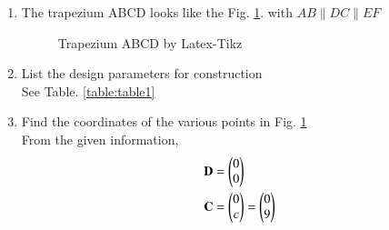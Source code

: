 %
\renewcommand{\theequation}{\theenumi}
\begin{enumerate}[label=\thesection.\arabic*.,ref=\thesection.\theenumi]

\item The trapezium ABCD looks like the Fig. \ref{fig:trapezium_ABCD}.
with $AB \parallel DC \parallel EF $


\begin{figure}[!ht]
\centering
\resizebox{\columnwidth}{!}{}
\caption{Trapezium ABCD by Latex-Tikz}
\label{fig:trapezium_ABCD}	
\end{figure}
%


%
%
\item List the design parameters for construction
\label{const:table1}
\\
\solution See Table. \ref{table:table1} 
%
\begin{table}[ht!]
\centering

\caption{To construct trapezium ABCD}
\label{table:table1}	
\end{table}


\item Find the coordinates of the various points in Fig. \ref{fig:trapezium_ABCD}
\label{const:trapezium_ABCD}
\\
%
\solution From the given information, 
\begin{align}
\label{eq:constr_d}
\mathbf{D} &= \begin{pmatrix}0\\0\end{pmatrix} 
\\
\mathbf{C} &= \begin{pmatrix}0\\c\end{pmatrix} = \begin{pmatrix}0\\9\end{pmatrix} 
\label{eq:constr_c}
\end{align}


\end{enumerate}
